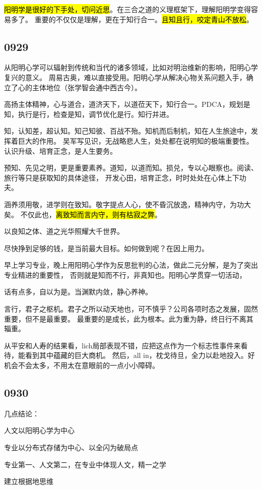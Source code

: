 \hl{阳明学是很好的下手处，切问近思}。在三合之道的义理框架下，理解阳明学变得容易多了。
重要的不仅仅是理解，更在于知行合一。\hl{且知且行，咬定青山不放松}。

\subsection{0929}

从阳明心学可以辐射到传统和当代的诸多领域，比如对明治维新的影响，阳明心学复兴的意义。
周易古奥，难以直接受用。阳明心学从解决心物关系问题入手，确立了心的主体地位（张学智会通中西古今）。

高扬主体精神，心与道合，道济天下，以道莅天下，知行合一。PDCA，规划是知，执行是行，检查是知，调节优化是行。知行并进。

知，认知差，超认知。知己知彼、百战不殆。知机而后制机，知在人生旅途中，发挥着巨大的作用。
吴军写见识，无战略悲人生，处处都在说明知的极端重要性。认识升级、培育正念，是人生要务。

预知、先见之明，更是重要素养。道知，以道而知。损兑，专以心眼察也。阅读、旅行等只是获取知的具体途径，
开发心田，培育正念，时时处处在心体上下功夫。

涵养须用敬，进学则在致知。敬字提点人心，使不昏沉放逸，精神内守，为功大矣。
不仅此也，\hl{离致知而言内守，则有枯寂之弊}。

以良知之体、道之光华照耀大千世界。

尽快挣到足够的钱，是当前最大目标。如何做到呢？在因上用力。

早上学习专业，晚上用阳明心学作为反思批判的心法，做此二元分解，是为了突出专业精进的重要性，
否则就是知而不行，非真知也。阳明心学贯穿一切活动，

话有点多，自以为是。当渊默内敛，静心养神。

言行，君子之枢机。君子之所以动天地也，可不慎乎？公司各项时态之发展，固然重要，但不是最重要。
最重要的是成长，此为根本。此为重为静，终日行不离其辎重。

从平安和人寿的结果看，lich局部表现不错，应把这点作为一个标志性事件来看待，能看到其中蕴藏的巨大商机。
然后，all in，枕戈待旦，全力以赴地投入。好机会不会太多，不用太在意眼前的一点小小障碍。

\subsection{0930}

几点结论：
\begin{enumbox}
\item 人文以阳明心学为中心
\item 专业以分布式存储为中心、以全闪为破局点
\item 专业第一、人文第二，在专业中体现人文，精一之学
\item 建立根据地思维
\end{enumbox}
